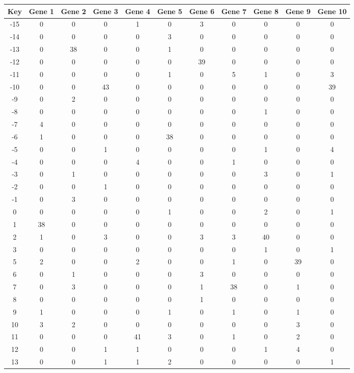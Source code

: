 \begin{tabular}{|c|c|c|c|c|c|c|c|c|c|c|}
\hline
Key & Gene 1 & Gene 2 & Gene 3 & Gene 4 & Gene 5 & Gene 6 & Gene 7 & Gene 8 & Gene 9 & Gene 10 \\
\hline
-15 & 0 & 0 & 0 & 1 & 0 & 3 & 0 & 0 & 0 & 0 \\
-14 & 0 & 0 & 0 & 0 & 3 & 0 & 0 & 0 & 0 & 0 \\
-13 & 0 & 38 & 0 & 0 & 1 & 0 & 0 & 0 & 0 & 0 \\
-12 & 0 & 0 & 0 & 0 & 0 & 39 & 0 & 0 & 0 & 0 \\
-11 & 0 & 0 & 0 & 0 & 1 & 0 & 5 & 1 & 0 & 3 \\
-10 & 0 & 0 & 43 & 0 & 0 & 0 & 0 & 0 & 0 & 39 \\
-9 & 0 & 2 & 0 & 0 & 0 & 0 & 0 & 0 & 0 & 0 \\
-8 & 0 & 0 & 0 & 0 & 0 & 0 & 0 & 1 & 0 & 0 \\
-7 & 4 & 0 & 0 & 0 & 0 & 0 & 0 & 0 & 0 & 0 \\
-6 & 1 & 0 & 0 & 0 & 38 & 0 & 0 & 0 & 0 & 0 \\
-5 & 0 & 0 & 1 & 0 & 0 & 0 & 0 & 1 & 0 & 4 \\
-4 & 0 & 0 & 0 & 4 & 0 & 0 & 1 & 0 & 0 & 0 \\
-3 & 0 & 1 & 0 & 0 & 0 & 0 & 0 & 3 & 0 & 1 \\
-2 & 0 & 0 & 1 & 0 & 0 & 0 & 0 & 0 & 0 & 0 \\
-1 & 0 & 3 & 0 & 0 & 0 & 0 & 0 & 0 & 0 & 0 \\
0 & 0 & 0 & 0 & 0 & 1 & 0 & 0 & 2 & 0 & 1 \\
1 & 38 & 0 & 0 & 0 & 0 & 0 & 0 & 0 & 0 & 0 \\
2 & 1 & 0 & 3 & 0 & 0 & 3 & 3 & 40 & 0 & 0 \\
3 & 0 & 0 & 0 & 0 & 0 & 0 & 0 & 1 & 0 & 1 \\
5 & 2 & 0 & 0 & 2 & 0 & 0 & 1 & 0 & 39 & 0 \\
6 & 0 & 1 & 0 & 0 & 0 & 3 & 0 & 0 & 0 & 0 \\
7 & 0 & 3 & 0 & 0 & 0 & 1 & 38 & 0 & 1 & 0 \\
8 & 0 & 0 & 0 & 0 & 0 & 1 & 0 & 0 & 0 & 0 \\
9 & 1 & 0 & 0 & 0 & 1 & 0 & 1 & 0 & 1 & 0 \\
10 & 3 & 2 & 0 & 0 & 0 & 0 & 0 & 0 & 3 & 0 \\
11 & 0 & 0 & 0 & 41 & 3 & 0 & 1 & 0 & 2 & 0 \\
12 & 0 & 0 & 1 & 1 & 0 & 0 & 0 & 1 & 4 & 0 \\
13 & 0 & 0 & 1 & 1 & 2 & 0 & 0 & 0 & 0 & 1 \\
\hline
\end{tabular}